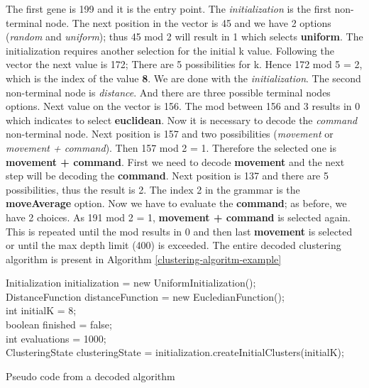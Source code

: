 \documentclass[journal]{IEEEtran}
\begin{document}
The first gene is 199 and it is the entry point. The \textit{initialization}  is the first non-terminal node. The next position in the vector is 45 
and we have 2 options  (\textit{random} and \textit{uniform}); thus 45 mod 2 will result in 1 which selects \textbf{uniform}. The initialization requires another selection for the initial k value. Following the vector the next value  is 172; There are 5 possibilities for k. Hence 172 mod 5 = 2, which is the index of the value \textbf{8}.
We are done with the \textit{initialization}. The second non-terminal node is \textit{distance}. And there are three possible terminal nodes options. Next value on the vector is 156. The mod between 
156 and 3 results in 0 which indicates to select \textbf{euclidean}. 
Now it is necessary to decode the \textit{command} non-terminal node. Next position is 157 and two possibilities (\textit{movement} or \textit{movement + command}). Then 157 mod 2 = 1. 
Therefore the selected one is \textbf{movement + command}. First we need to decode \textbf{movement} and the next step will be decoding the \textbf{command}. Next position is 137 and there are 5 possibilities, thus the result is 2. 
The index 2 in the grammar is the \textbf{moveAverage} option. Now we have to evaluate the \textbf{command}; as before, we have 2 choices. As 191 mod 2 = 1, \textbf{movement + command} is selected again. This is repeated until the mod results in 0 and then last \textbf{movement} is selected or until the max depth limit (400) is exceeded. The entire decoded clustering algorithm is present in Algorithm \ref{clustering-algoritm-example}

\begin{algorithm}[!htb]
	\label{clustering-algoritm-example}
	Initialization initialization = new UniformInitialization(); \\
	DistanceFunction distanceFunction = new EucledianFunction(); \\
	int initialK = 8; \\
	boolean finished = false; \\
	int evaluations = 1000;\\
	ClusteringState 
	clusteringState = initialization.createInitialClusters(initialK); \\
	\caption{Pseudo code from a decoded algorithm}
\end{algorithm}
\end{document}
